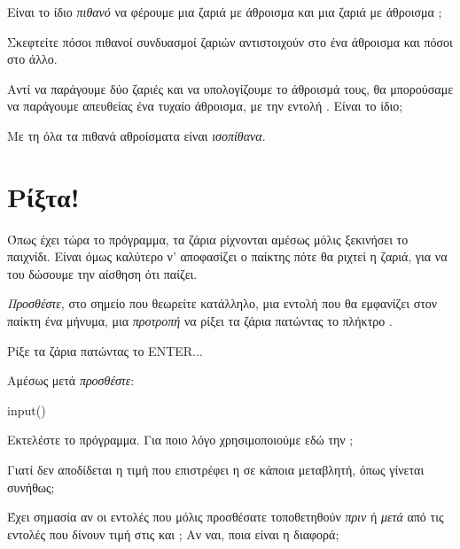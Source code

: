 \documentclass[a4paper,11pt,oneside]{book}
\begin{document}
\begin{step}
Είναι το ίδιο \emph{πιθανό} να φέρουμε μια ζαριά με άθροισμα  και μια ζαριά με άθροισμα ;

\begin{note}
Σκεφτείτε πόσοι πιθανοί συνδυασμοί ζαριών αντιστοιχούν στο ένα άθροισμα και πόσοι στο άλλο.
\end{note}

\marginnote[14pt]{\icondiscuss}
\dottedline

Αντί να παράγουμε δύο ζαριές και να υπολογίζουμε το άθροισμά τους, θα μπορούσαμε να παράγουμε απευθείας ένα τυχαίο άθροισμα, με την εντολή . Είναι το ίδιο;

\begin{note}
Με τη  όλα τα πιθανά αθροίσματα είναι \emph{ισοπίθανα}.
\end{note}

\marginnote[14pt]{\icondiscuss}

\dottedline
\end{step}

\section{Ρίξτα!}

Όπως έχει τώρα το πρόγραμμα, τα ζάρια ρίχνονται αμέσως μόλις ξεκινήσει το παιχνίδι. Είναι όμως καλύτερο ν' αποφασίζει ο παίκτης πότε θα ριχτεί η ζαριά, για να του δώσουμε την αίσθηση ότι παίζει.

\begin{step}
\emph{Προσθέστε}, στο σημείο που θεωρείτε κατάλληλο, μια εντολή που θα εμφανίζει στον παίκτη ένα μήνυμα, μια \emph{προτροπή} να ρίξει τα ζάρια πατώντας το πλήκτρο .


\marginnote[14pt]{\iconcomputer}
\begin{pyterm}
Ρίξε τα ζάρια πατώντας το ENTER...
\end{pyterm}

Αμέσως μετά \emph{προσθέστε}:

\begin{pynew}
input()
\end{pynew}

Εκτελέστε το πρόγραμμα. Για ποιο λόγο χρησιμοποιούμε εδώ την ; 

\marginnote[14pt]{\icondiscuss}
\dottedline

Γιατί δεν αποδίδεται η τιμή που επιστρέφει η  σε κάποια μεταβλητή, όπως γίνεται συνήθως;

\marginnote[14pt]{\icondiscuss}
\dottedline

Έχει σημασία αν οι εντολές που μόλις προσθέσατε τοποθετηθούν \emph{πριν} ή \emph{μετά} από τις εντολές που δίνουν τιμή στις  και ; Αν ναι, ποια είναι η διαφορά; 

\marginnote[14pt]{\icondiscuss}
\dottedline

\dottedline
\end{step}
\end{document}
